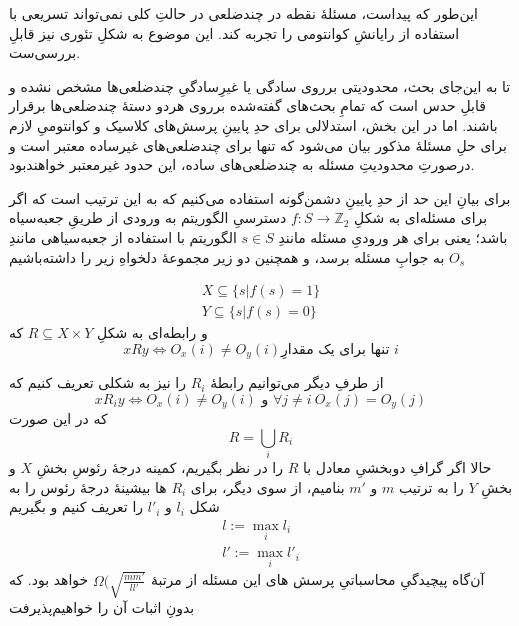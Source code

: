 
این‌طور که پیداست، مسئلهٔ نقطه در چندضلعی در حالتِ کلی نمی‌تواند تسریعی با استفاده از رایانشِ کوانتومی را تجربه کند. این موضوع به شکلِ تئوری نیز قابلِ بررسی‌ست.

تا به این‌جای بحث، محدودیتی برروی سادگی یا غیرِسادگیِ چندضلعی‌ها مشخص نشده و قابلِ حدس است که تمامِ بحث‌های گفته‌شده برروی هردو دستهٔ چندضلعی‌ها برقرار باشند. اما در این بخش، استدلالی برای حدِ پایینِ پرسش‌های کلاسیک و کوانتومیِ لازم برای حلِ مسئلهٔ مذکور بیان می‌شود که تنها برای چندضلعی‌های غیرساده معتبر است و درصورتِ محدودیتِ مسئله به چندضلعی‌های ساده، این حدود غیرمعتبر خواهندبود.

برای بیانِ این حد از حدِ پایینِ دشمن‌گونه استفاده می‌کنیم که به این ترتیب است که اگر برای مسئله‌ای به شکلِ
$f: S \to \mathbb{Z}_2$
دسترسیِ الگوریتم به ورودی از طریقِ جعبه‌سیاه باشد؛ یعنی برای هر ورودیِ مسئله مانندِ $s \in S$ الگوریتم با استفاده از جعبه‌سیاهی مانندِ
$O_s$
به جوابِ مسئله برسد، و همچنین دو زیر مجموعهٔ دلخواهِ زیر را داشته‌باشیم

\begin{eqnarray}
    X \subseteq \{ s | f(s) = 1 \} \\
    Y \subseteq \{ s | f(s) = 0 \}
\end{eqnarray}
و رابطه‌ای به شکلِ
$R \subseteq X \times Y $
که 
\begin{equation}
    x R y \Leftrightarrow O_x(i) \ne O_y(i) \text{تنها برای یک مقدارِ $i$}
\end{equation}

از طرفِ دیگر می‌توانیم رابطهٔ $R_i$ را نیز به شکلی تعریف کنیم که
\begin{equation}
    x R_i y \Leftrightarrow O_x(i) \ne O_y(i) \text{ و } \forall j \ne i ~ O_x(j) = O_y(j)
\end{equation}
که در این صورت
\begin{equation}
    R = \bigcup_{i} R_i
\end{equation}
حالا اگر گرافِ دوبخشیِ معادل با $R$ را در نظر بگیریم، کمینه درجهٔ رئوسِ بخشِ $X$ و بخشِ $Y$ را به ترتیب 
$m$
و 
$m'$
بنامیم، از سوی دیگر، برای $R_i$ ها بیشینهٔ  درجهٔ رئوس را به شکل $l_i$ و $l'_i$ را تعریف کنیم و بگیریم
\begin{eqnarray}
    l := \max_i l_i \\
    l':= \max_i l'_i
\end{eqnarray}
آن‌گاه پیچیدگیِ محاسباتیِ پرسش های این مسئله از مرتبهٔ
$\Omega(\sqrt{\frac{m m'}{l l'}}$
خواهد بود. که بدونِ اثبات آن را خواهیم‌پذیرفت  



